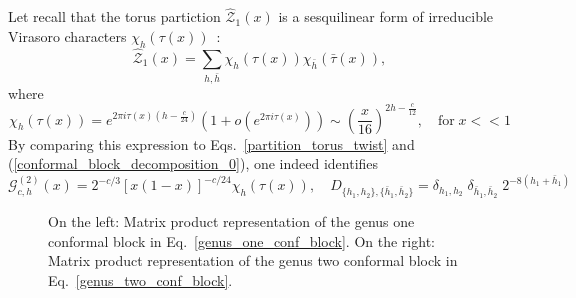\documentclass[a4paper,11pt]{article}
\begin{document}
\noindent Let recall that the torus partiction $\mathcal{\hat{Z}}_1(x)$ is a sesquilinear form of irreducible Virasoro characters $\chi_{h}(\tau(x))$~\cite{Cappelli, Cappelli2}:
\begin{equation}
\mathcal{\hat{Z}}_1(x) = \sum_{h,\bar{h}} \chi_{h}(\tau(x)) \chi_{\bar{h}}(\bar{\tau}(x)),
\end{equation}
where 
\begin{equation}
\chi_{h}(\tau(x)) = e^{2\pi i \tau(x)\left(h-\frac{c}{24}\right)}\left(1+ o\left(e^{2\pi i \tau(x)}\right)\right) \sim \left(\frac{x}{16}\right)^{ 2 h-\frac{c}{12}}, \quad \text{for}\; x<<1
\end{equation}
 By comparing this expression  to Eqs.~\eqref{partition_torus_twist}  and (\ref{conformal_block_decomposition_0}), one indeed identifies 
\begin{equation}\label{character_conf_block}
\mathcal{G}_{c,h}^{(2)}(x)=2^{-c/3}[x(1-x)]^{-c/24}\chi_{h}(\tau(x)),\quad  D_{\{ h_1, h_2 \}, \{ \bar{h}_1,\bar{h}_2\} } =\delta_{h_1,h_2}\;\delta_{\bar{h}_1,\bar{h}_2} \;2^{-8 (h_1+\bar{h}_1)}
\end{equation}



\begin{figure}[t]
\centering
\caption{On the left: Matrix product representation of the genus one conformal block in Eq.~\eqref{genus_one_conf_block}. On the right: Matrix product representation of the genus two conformal block in Eq.~\eqref{genus_two_conf_block}.}
\label{fig-g1}
\end{figure}
\end{document}
